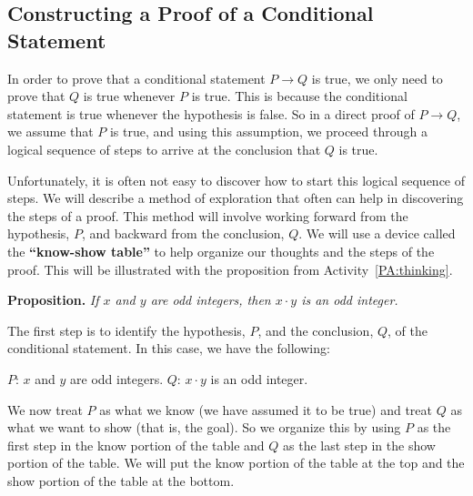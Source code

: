 \subsection*{Constructing a Proof of a Conditional Statement}
In order to prove that a conditional statement $P \to Q$ is true, we only need to prove that  $Q$  is true whenever  $P$  is true.  This is because the conditional statement is true whenever the hypothesis is false.  So in a direct proof of  $P \to Q$, we assume that  $P$  is true, and using this assumption, we proceed through a logical sequence of steps to arrive at the conclusion that  $Q$  is true.  

Unfortunately, it is often not easy to discover how to start this logical sequence of steps. 
We will describe a method of exploration that often can help in discovering the steps of a proof.  This method will involve working forward from the hypothesis, $P$, and backward from the conclusion, $Q$.  We will use a device called the \textbf{``know-show table''}
%
 to help organize our thoughts and the steps of the proof.  This will be illustrated with the proposition from \typeu Activity~\ref*{PA:thinking}.
\begin{flushleft}
\textbf{Proposition.}  \emph{If  $x$  and  $y$  are odd integers, then $ x \cdot y$  is an odd integer.}
\end{flushleft}
The first step is to identify the hypothesis,  $ P$,  and the conclusion, $Q$,  of the conditional statement.  
In this case,  we have the following:
\begin{center}
$P$: $x$ and $y$ are odd integers. \qquad $Q$: $x \cdot y$ is an odd integer.
\end{center}
%
We now treat  $P$  as what we know (we have assumed it to be true) and treat $Q$ as what we want to show (that is, the goal).  So we organize this by using  $P$  as the first step in the know portion of the table and  $Q$  as the last step in the show portion of the table.  We will put the know portion of the table at the top and the show portion of the table at the bottom.
